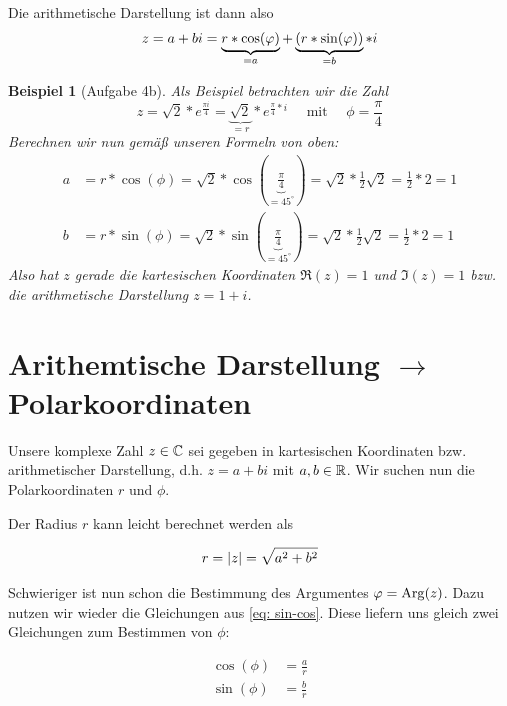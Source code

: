 \documentclass[ngerman, a4paper, 11pt]{article}
\theoremstyle{nonumberplain}
\newtheorem{beispiel}{Beispiel}
\renewcommand{\i}{i}
\begin{document}
	Die arithmetische Darstellung ist dann also
	\begin{equation*}
		z = a + b \i = \underbrace{r * \cos(\phi)}_{=a}  + \underbrace{\brackets{ r * \sin(\phi) }}_{=b} * \i
	\end{equation*}

	\begin{beispiel}[Aufgabe 4b]	
		Als Beispiel betrachten wir die Zahl 
		\begin{equation*}
			z = \sqrt{2} * e^{\frac{\pi \i}{4}} = \underbrace{\sqrt{2}}_{=r} * e^{\frac{\pi}{4} * \i} \quad \text{ mit } \quad \phi = \frac{\pi}{4}
		\end{equation*}
		Berechnen wir nun gemäß unseren Formeln von oben:
		\begin{align*}
			a &= r * \cos(\phi) = \sqrt{2} * \cos(\underbrace{\frac{\pi}{4}}_{=45^\circ}) = \sqrt{2} * \frac{1}{2} \sqrt{2} = \frac{1}{2} * 2 = 1 \\
			b &= r * \sin(\phi) = \sqrt{2} * \sin(\underbrace{\frac{\pi}{4}}_{=45^\circ}) = \sqrt{2} * \frac{1}{2} \sqrt{2} = \frac{1}{2} * 2 = 1 
		\end{align*}
		Also hat $z$ gerade die kartesischen Koordinaten $\Re(z) = 1$ und $\Im(z) = 1$ bzw. die arithmetische Darstellung $z = 1 + \i$.
	\end{beispiel}
	\pagebreak

	\section*{Arithemtische Darstellung $\to$ Polarkoordinaten}
	
	Unsere komplexe Zahl $z \in \mathbb{C}$ sei gegeben in kartesischen Koordinaten bzw. arithmetischer Darstellung, d.h. $z = a + b \i$ mit $a,b \in \mathbb{R}$. 
	Wir suchen nun die Polarkoordinaten $r$ und $\phi$.
	
	Der Radius $r$ kann leicht berechnet werden als
	\begin{tcolorbox}[colback=cdorange!10,colframe=cdorange]
		\vspace{-0.5em}
		\begin{equation*}
			r = \left| z \right| = \sqrt{a^2 + b^2} 
		\end{equation*}
	\end{tcolorbox}

	Schwieriger ist nun schon die Bestimmung des Argumentes $\varphi = \operatorname{Arg}(z)$. Dazu nutzen wir wieder die Gleichungen aus \eqref{eq: sin-cos}. Diese liefern uns gleich zwei Gleichungen zum Bestimmen von $\phi$:
	\begin{tcolorbox}[colback=cdorange!10,colframe=cdorange]
		\begin{equation*}
			\begin{aligned}
				\cos(\phi) &= \frac{a}{r} \\
				\sin(\phi) &= \frac{b}{r} 
			\end{aligned}
		\end{equation*}
	\end{tcolorbox}
\end{document}
